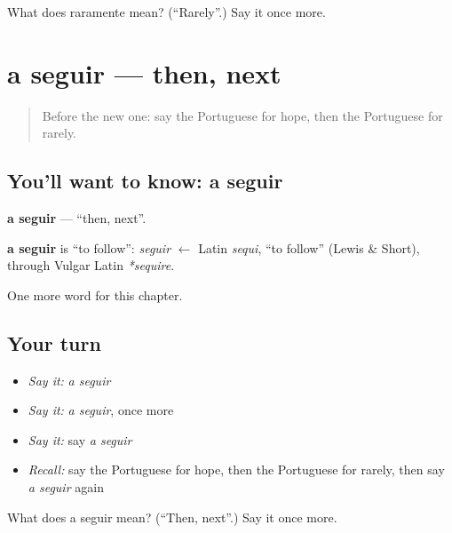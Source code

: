 \begin{tcolorbox}[breakable,colback=teal!4,colframe=teal!35!black,title={Before you move on}]
What does raramente mean? (\textquotedblleft{}Rarely\textquotedblright{}.) Say it once more.
\end{tcolorbox}
\section[a seguir]{a seguir — then, next}

\label{lesson:PT-C150-seguir}



\begin{quote}
Before the new one: say the Portuguese for hope, then the Portuguese for rarely.
\end{quote}

\subsection*{You'll want to know: a seguir}
\textbf{a seguir} — \textquotedblleft{}then, next\textquotedblright{}.

\begin{cousinweb}
\textbf{a seguir} is \textquotedblleft{}to follow\textquotedblright{}: \emph{seguir} $\leftarrow$ Latin \emph{sequi}, \textquotedblleft{}to follow\textquotedblright{} (Lewis \& Short), through Vulgar Latin \emph{*sequire}.
\end{cousinweb}

\begin{grammarlens}[title={What you've built}]
One more word for this chapter.
\end{grammarlens}

\subsection*{Your turn}
\begin{itemize}
\raggedright
  \item \emph{Say it:} \emph{a seguir}
  \item \emph{Say it:} \emph{a seguir}, once more
  \item \emph{Say it:} say \emph{a seguir}
  \item \emph{Recall:} say the Portuguese for hope, then the Portuguese for rarely, then say \emph{a seguir} again
\end{itemize}

\begin{tcolorbox}[breakable,colback=teal!4,colframe=teal!35!black,title={Before you move on}]
What does a seguir mean? (\textquotedblleft{}Then, next\textquotedblright{}.) Say it once more.
\end{tcolorbox}
